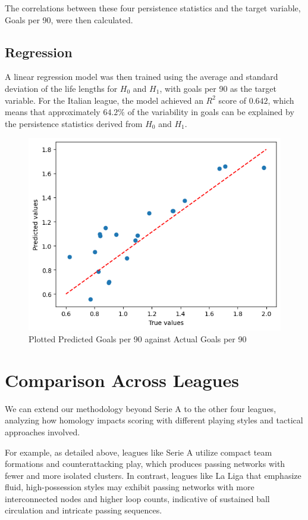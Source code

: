 \documentclass[10pt,twocolumn]{article}
\begin{document}
The correlations between these four persistence statistics and the target variable, Goals per 90, were then calculated.

\subsection*{Regression}
A linear regression model was then trained using the average and standard deviation of the life lengths for $ H_0 $ and $ H_1 $, with goals per 90 as the target variable. For the Italian league, the model achieved an $R^2$ score of $0.642$, which means that approximately $64.2\%$ of the variability in goals can be explained by the persistence statistics derived from $ H_0 $ and $ H_1 $.

\begin{figure}[H]
    \centering
    \includegraphics[width=1\linewidth]{images/serie_A_linear_reg.png}
    \caption{Plotted Predicted Goals per 90 against Actual Goals per 90}
    \label{fig:serie_A_linear_reg}
\end{figure}

\section*{Comparison Across Leagues}
We can extend our methodology beyond Serie A to the other four leagues, analyzing how homology impacts scoring with different playing styles and tactical approaches involved. 

For example, as detailed above, leagues like Serie A utilize compact team formations and counterattacking play, which produces passing networks with fewer and more isolated clusters. In contrast, leagues like La Liga that emphasize fluid, high-possession styles may exhibit passing networks with more interconnected nodes and higher loop counts, indicative of sustained ball circulation and intricate passing sequences. 
\end{document}
